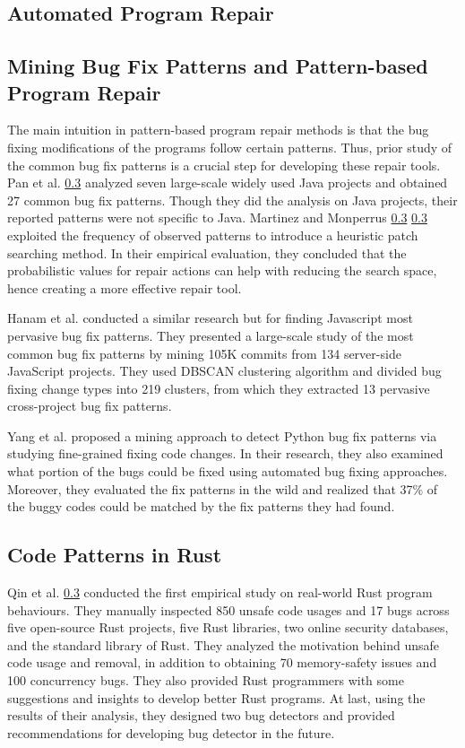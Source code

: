 \subsection{Automated Program Repair}



\subsection{Mining Bug Fix Patterns and Pattern-based Program Repair}

The main intuition in pattern-based program repair methods is that the bug fixing modifications of the programs follow certain patterns. Thus, prior study of the common bug fix patterns is a crucial step for developing these repair tools. Pan et al. \ref{} analyzed seven large-scale widely used Java projects and obtained 27 common bug fix patterns. Though they did the analysis on Java projects, their reported patterns were not specific to Java. Martinez and Monperrus \ref{} \ref{} exploited the frequency of observed patterns to introduce a heuristic patch searching method. In their empirical evaluation, they concluded that the probabilistic values for repair actions can help with reducing the search space, hence creating a more effective repair tool.

Hanam et al. conducted a similar research but for finding Javascript most pervasive bug fix patterns. They presented a large-scale study of the most common bug fix patterns by mining 105K commits from 134 server-side JavaScript projects. They used DBSCAN clustering algorithm and divided bug fixing change types into 219 clusters, from which they extracted 13 pervasive cross-project bug fix patterns. 

Yang et al. proposed a mining approach to detect Python bug fix patterns via studying fine-grained fixing code changes. In their research, they also examined what portion of the bugs could be fixed using automated bug fixing approaches. Moreover, they evaluated the fix patterns in the wild and realized that 37\% of the buggy codes could be matched by the fix patterns they had found. 

\subsection{Code Patterns in Rust}

Qin et al. \ref{} conducted the first empirical study on real-world Rust program behaviours. They manually inspected 850 unsafe code usages and 17 bugs across five open-source Rust projects, five Rust libraries, two online security databases, and the standard library of Rust. They analyzed the motivation behind unsafe code usage and removal, in addition to obtaining 70 memory-safety issues and 100 concurrency bugs. They also provided Rust programmers with some suggestions and insights to develop better Rust programs. At last, using the results of their analysis, they designed two bug detectors and provided recommendations for developing bug detector in the future.

